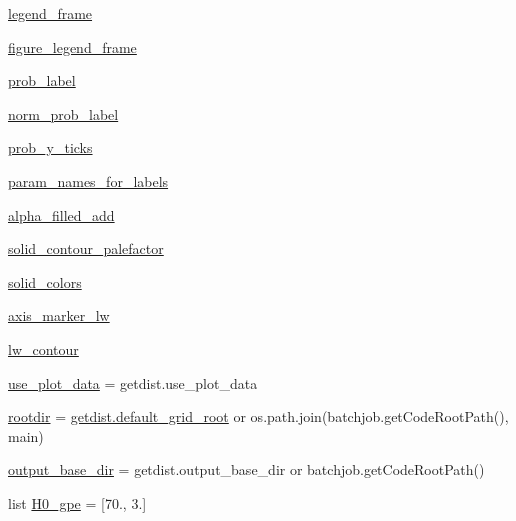 \begin{DoxyCompactItemize}
\item 
\mbox{\hyperlink{namespaceplanckStyle_a5cd6a8fcf5c1cc1012aaede050a60874}{legend\+\_\+frame}}
\item 
\mbox{\hyperlink{namespaceplanckStyle_ada68e2d06fded344af15f3257947da3f}{figure\+\_\+legend\+\_\+frame}}
\item 
\mbox{\hyperlink{namespaceplanckStyle_a04f5998586e8cfb78e0d45335efc5d2d}{prob\+\_\+label}}
\item 
\mbox{\hyperlink{namespaceplanckStyle_a73d28ce8fe3e3362cfb77e224ab01507}{norm\+\_\+prob\+\_\+label}}
\item 
\mbox{\hyperlink{namespaceplanckStyle_a23a7dafd05ac6efc154b6f7c0e38b871}{prob\+\_\+y\+\_\+ticks}}
\item 
\mbox{\hyperlink{namespaceplanckStyle_a487cbdd26d7cf70a07476d433a20230f}{param\+\_\+names\+\_\+for\+\_\+labels}}
\item 
\mbox{\hyperlink{namespaceplanckStyle_a6cc22705c207a353d63ab7ce94bb5569}{alpha\+\_\+filled\+\_\+add}}
\item 
\mbox{\hyperlink{namespaceplanckStyle_aec8131a350a73149ba21b9d03dd86519}{solid\+\_\+contour\+\_\+palefactor}}
\item 
\mbox{\hyperlink{namespaceplanckStyle_a19f3920eb85d18b86f752a4c6d5d8b18}{solid\+\_\+colors}}
\item 
\mbox{\hyperlink{namespaceplanckStyle_adf5ab5cbacdf28208950356fff835b61}{axis\+\_\+marker\+\_\+lw}}
\item 
\mbox{\hyperlink{namespaceplanckStyle_af927756912359e87c6e2efecc463f68c}{lw\+\_\+contour}}
\item 
\mbox{\hyperlink{namespaceplanckStyle_a6c08ad944bbbfc8d022132a92f6d46e0}{use\+\_\+plot\+\_\+data}} = getdist.\+use\+\_\+plot\+\_\+data
\item 
\mbox{\hyperlink{namespaceplanckStyle_a73d32ce5ddb0dc07af25109a55439f53}{rootdir}} = \mbox{\hyperlink{namespacegetdist_a2ed5e7cfdf637a19ad09e719c419963a}{getdist.\+default\+\_\+grid\+\_\+root}} or os.\+path.\+join(batchjob.\+get\+Code\+Root\+Path(), \textquotesingle{}main\textquotesingle{})
\item 
\mbox{\hyperlink{namespaceplanckStyle_afdef9e670e01a82ac933867291c917f8}{output\+\_\+base\+\_\+dir}} = getdist.\+output\+\_\+base\+\_\+dir or batchjob.\+get\+Code\+Root\+Path()
\item 
list \mbox{\hyperlink{namespaceplanckStyle_adb1a90ac56034e01765e8f25230d701b}{H0\+\_\+gpe}} = \mbox{[}70., 3.\mbox{]}
\end{DoxyCompactItemize}


